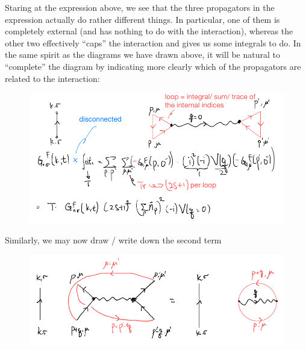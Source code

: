 Staring at the expression above, we see that the three propagators in the expression actually do rather different things. In particular, one of them is completely external (and has nothing to do with the interaction), whereas the other two effectively ``caps'' the interaction and gives us some integrals to do. In the same spirit as the diagrams we have drawn above, it will be natural to ``complete'' the diagram by indicating more clearly which of the propagators are related to the interaction:

\begin{figure}[H]
    \centering
    \includegraphics[width=\textwidth]{jupyterbook/data/fig/lec17-fig00.png}
\end{figure}

Similarly, we may now draw / write down the second term

\begin{figure}[H]
    \centering
    \includegraphics[width=\textwidth]{jupyterbook/data/fig/lec17-fig01.png}
\end{figure}

